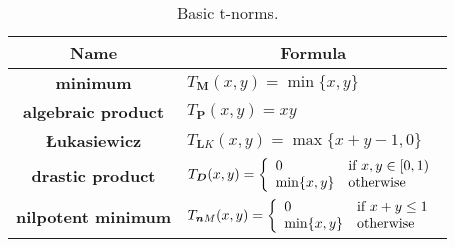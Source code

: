 \begin{table}[ht!]
	\setlength\tabcolsep{5pt}
	\renewcommand{\arraystretch}{1.5}
	\centering
	\begin{tabular}{|c|l|}
		\hline
		\bf Name              & \multicolumn{1}{c|}{\bf Formula}                                                                                           \\ \hline
		\bf minimum           & $T_{\bm M}(x,y)=\min\{x,y\}$                                                                                             \\ \hline
		\bf algebraic product & $T_{\bm P}(x,y)=xy$                                                                                                    \\ \hline
		\bf {\L}ukasiewicz       & $T_{\bm LK}(x,y)=\max\{x+y-1,0\}$                                                                                        \\ \hline
		\bf drastic product   & $T_{\bm D}(x,y)=\left\{\begin{array}{ll}0 &\hbox{if } x,y \in [0,1)\\\min\{x,y\}&\hbox{otherwise}\end{array}\right.$ \\ \hline
		\bf nilpotent minimum & $T_{\bm nM}(x,y)=\left\{\begin{array}{ll}0 &\hbox{if } x+y \leq 1\\\min\{x,y\}&\hbox{otherwise}\end{array}\right.$   \\ \hline
	\end{tabular}
	\caption{Basic t-norms.}
	\label{table:basic_tnorms}
\end{table}
